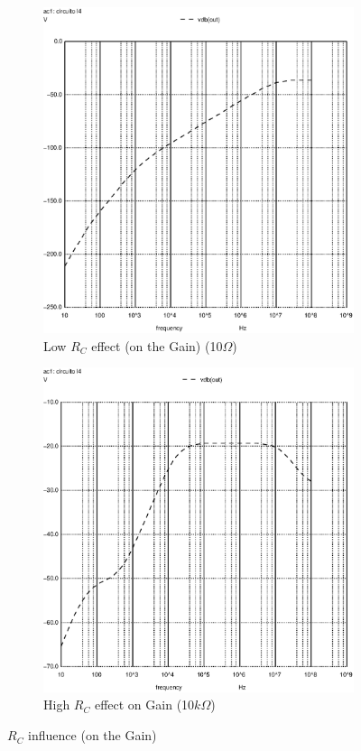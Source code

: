 \begin{figure}[h]
\centering
\begin{subfigure}{.5\textwidth}
    \centering
    \includegraphics[scale=0.33]{images/rclow_10.eps}
    \caption{Low $R_C$ effect (on the Gain) (10$\Omega$)}
\end{subfigure}%
\begin{subfigure}{.5\textwidth}
    \centering
    \includegraphics[scale=0.33]{images/rchigh_100k.eps}
    \caption{High $R_C$ effect on Gain (10$k\Omega$)}
    \label{fig:RC_High}
\end{subfigure}
\caption{$R_C$ influence (on the Gain)}
\end{figure}


